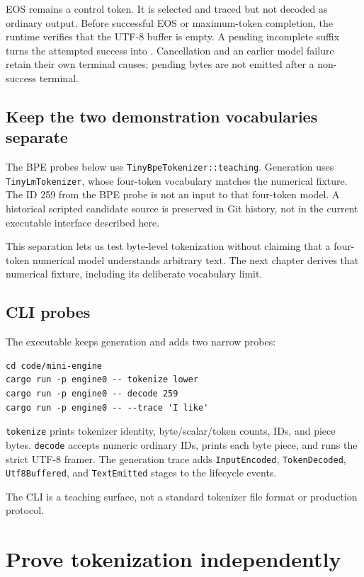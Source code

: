 EOS remains a control token. It is selected and traced but not decoded
as ordinary output. Before successful EOS or maximum-token completion,
the runtime verifies that the UTF-8 buffer is empty. A pending
incomplete suffix turns the attempted success into
\texttt{}. Cancellation and an earlier
model failure retain their own terminal causes; pending bytes are not
emitted after a non-success terminal.

\subsection{Keep the two demonstration vocabularies separate}
\label{separate-demonstration-vocabularies}
The BPE probes below use \texttt{TinyBpeTokenizer::teaching}. Generation uses
\texttt{TinyLmTokenizer}, whose four-token vocabulary matches the numerical
fixture. The ID 259 from the BPE probe is not an input to that four-token
model. A historical scripted candidate source is preserved in Git history,
not in the current executable interface described here.

This separation lets us test byte-level tokenization without claiming that a
four-token numerical model understands arbitrary text. The next chapter
derives that numerical fixture, including its deliberate vocabulary limit.

\subsection{CLI probes}\label{cli-probes}

The executable keeps generation and adds two narrow probes:

\begin{verbatim}
cd code/mini-engine
cargo run -p engine0 -- tokenize lower
cargo run -p engine0 -- decode 259
cargo run -p engine0 -- --trace 'I like'
\end{verbatim}

\texttt{tokenize} prints tokenizer identity, byte/scalar/token counts,
IDs, and piece bytes. \texttt{decode} accepts numeric ordinary IDs,
prints each byte piece, and runs the strict UTF-8 framer. The generation
trace adds \texttt{InputEncoded}, \texttt{TokenDecoded},
\texttt{Utf8Buffered}, and \texttt{TextEmitted} stages to the 
lifecycle events.

The CLI is a teaching surface, not a standard tokenizer file format or
production protocol.

\section{Prove tokenization
independently}\label{prove-tokenization-independently}

